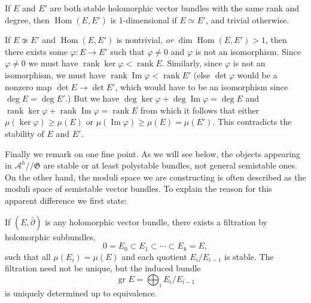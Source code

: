 \documentclass[12pt,letterpaper,reqno]{article}
\numberwithin{equation}{section}
\newcommand{\fG}{{\mathfrak G}}
\newcommand{\cA}{\ensuremath{\mathcal A}}
\newcommand{\kq}{/\!\!/}
\newcommand{\ti}[1]{\textit{#1}}
\DeclareMathOperator{\im}{Im}
\DeclareMathOperator{\Hom}{Hom}
\DeclareMathOperator{\rank}{rank}
\DeclareMathOperator{\gr}{gr}
\begin{document}
\begin{prop} If $E$ and $E'$ are both stable
holomorphic vector bundles with the same rank and degree,
then $\Hom(E,E')$ is 1-dimensional if $E \simeq E'$,
and trivial otherwise.
\end{prop}
\begin{pf} \cite{MR98b:14010}
If $E \not \simeq E'$ and $\Hom(E,E')$ is nontrivial, \ti{or}
$\dim \Hom(E,E') > 1$, then there exists some $\varphi: E \to E'$
such that $\varphi \neq 0$ and $\varphi$ is not an isomorphism.
Since $\varphi \neq 0$ we must have $\rank \ker \varphi < \rank E$.
Similarly, since $\varphi$ is not an isomorphism,
we must have $\rank \im \varphi < \rank E'$ (else $\det \varphi$ would be a nonzero map
$\det E \to \det E'$, which would have to be an isomorphism
since $\deg E = \deg E'$.)
But we have $\deg \ker \varphi + \deg \im \varphi = \deg E$
and $\rank \ker \varphi + \rank \im \varphi = \rank E$
from which it follows that either $\mu(\ker \varphi) \ge \mu(E)$ or $\mu(\im \varphi) \ge \mu(E) = \mu(E')$.
This contradicts the stability of $E$ and $E'$.
\end{pf}

Finally we remark on one fine point.
As we will see below, the objects appearing in $\cA^h \kq \fG$
are stable or at least polystable bundles,
not general semistable ones. On the other hand, the moduli space
we are constructing is often described as the moduli space of
semistable vector bundles.
To explain the reason for this apparent difference we first state:

\begin{prop}
If $(E, \bar\partial)$ is any holomorphic vector bundle,
there exists a filtration by holomorphic subbundles,
\begin{equation}
 0 = E_0 \subset E_1 \subset \cdots \subset E_k = E,
\end{equation}
such that all $\mu(E_i) = \mu(E)$ and
each quotient $E_i / E_{i-1}$ is stable.
The filtration need not be unique, but the induced
bundle
\begin{equation}
  \gr E = \bigoplus_i E_i / E_{i-1}
\end{equation}
is uniquely determined up to equivalence.
\end{prop}

\end{document}
